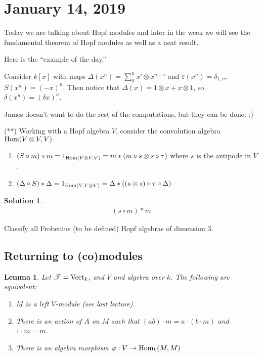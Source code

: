 \documentclass[12pt]{article}
\theoremstyle{break}
\theoremstyle{nonumberbreak}
\newtheorem{sol}{Solution}
\theoremstyle{changebreak}
\newtheorem{lem}[thm]{Lemma}
\theoremstyle{break}
\theoremstyle{nonumberbreak}
\theoremstyle{nonumberplain}
\theoremstyle{change}
\newcommand*{\Hom}{\ensuremath\text{Hom}}
\newcommand*{\Vectk}{\operatorname{Vect}_k}
\newcommand*{\scrT}{\ensuremath\mathscr{T}}
\begin{document}
\section{January 14, 2019}
Today we are talking about Hopf modules and later in the week we will see the fundamental
theorem of Hopf modules as well as a neat result.

Here is the ``example of the day.''
\begin{ex}
	Consider $k[x]$ with maps $\Delta(x^n)=\sum_0^nx^i\otimes x^{n-i}$ and $\varepsilon(x^n)=\delta_{1,n}$. 
	$S(x^n)=(-x)^n$. Then notice that $\Delta(x)=1\otimes x+x\otimes 1$, so $\delta(x^n)=(\delta x)^n$.

	James doesn't want to do the rest of the computations, but they can be done. :)
\end{ex}

\begin{prob}\label{prob-4.1}
	(**) Working with a Hopf algebra $V$, consider the convolution algebra $\Hom(V\otimes V,V)$
	\begin{enumerate}
		\item $(S\circ m)\ast m=1_{\Hom(V\otimes V,V)}=m\ast(m\circ s\otimes s\circ\tau)$ where $s$ is the antipode in $V$.
		\item $(\Delta\circ S)\ast \Delta=1_{\Hom(V,V\otimes V)}=\Delta\ast((s\otimes s)\circ\tau\circ \Delta)$
	\end{enumerate}
\end{prob}
\begin{sol}
	\begin{align*}
		(s\circ m)\ast m
	\end{align*}
\end{sol}
\begin{prob}
	Classify all Frobenius (to be defined) Hopf algebras of dimension 3.
\end{prob}

\subsection{Returning to (co)modules}\label{subsec-comod}
\begin{lem}
	Let $\scrT=\Vectk$, and $V$ and algebra over $k$. The following are equivalent:
	\begin{enumerate}
		\item $M$ is a left $V$-module (see last lecture).
		\item There is an action of $A$ on $M$ such that $(ab)\cdot m=a\cdot (b\cdot m)$ and $1\cdot m=m$.
		\item There is an algebra morphism $\varphi:V\to\Hom_k(M,M)$
	\end{enumerate}
\end{lem}
\end{document}
